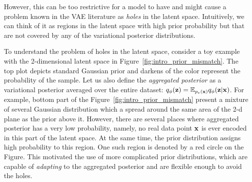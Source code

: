 However, this can be too restrictive for a model to have and might cause a problem known in the VAE literature as \textit{holes} in the latent space. Intuitively, we can think of it as regions in the latent space with high prior probability but that are not covered by any of the variational posterior distributions. 

To understand the problem of holes in the latent space, consider a toy example with the 2-dimensional latent space in Figure~\ref{fig:intro_prior_mismatch}. The top plot depicts standard Gaussian prior and darkens of the color represent the probability of the sample. Let us also define the \textit{aggregated posterior} as a variational posterior averaged over the entire dataset: $q_{\phi}({\mathbf{z}}) = \mathbb{E}_{p_{e}({\mathbf{x}})}q_{\phi}({\mathbf{z}}|{\mathbf{x}})$. For example, bottom part of the Figure~\ref{fig:intro_prior_mismatch} present a mixture of several Gaussian distribution which a spread around the same area of the 2-d plane as the prior above it. However, there are several places where aggregated posterior has a very low probability, namely, no real data point ${\mathbf{x}}$ is ever encoded in this part of the latent space. At the same time, the prior distribution assigns high probability to this region. One such region is denoted by a red circle on the Figure. 
This motivated the use of more complicated prior distributions, which are capable of \textit{adapting} to the aggregated posterior and are flexible enough to avoid the holes. 

